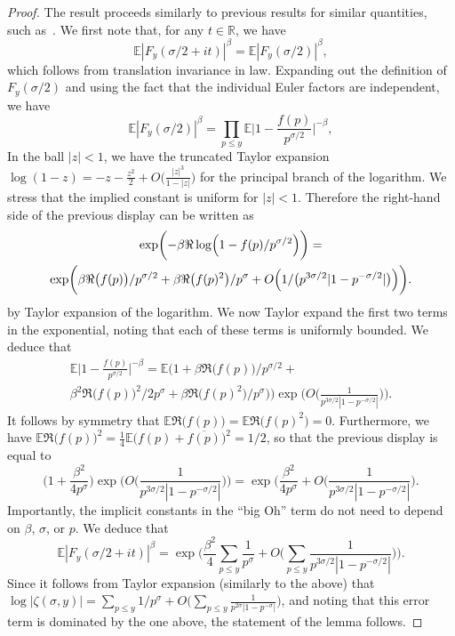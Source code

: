 \documentclass[12pt,a4paper,reqno]{amsart}
\numberwithin{equation}{section}
\def\R{\mathbb R}
\def\E{\mathbb E}
\def\leq {\leqslant}
\theoremstyle{remark}
\theoremstyle{definition}
\numberwithin{equation}{section}
\theoremstyle{remark}
\def\E{\mathbb E}
\begin{document}
\begin{proof}
The result proceeds similarly to previous results for similar quantities, such as~\cite[Euler Product Result 1]{Harperlargevalue}. We first note that, for any $t \in \R$, we have
\[
\E |F_y (\sigma / 2 + it) |^{\beta} = \E |F_y (\sigma / 2) |^{\beta},
\]
which follows from translation invariance in law. Expanding out the definition of $F_y (\sigma / 2)$ and using the fact that the individual Euler factors are independent, we have
\[
\E |F_y (\sigma / 2) |^{\beta} = \prod_{p \leq y} \E \biggl| 1 - \frac{f(p)}{p^{\sigma/2}} \biggr|^{-\beta} ,
\]
In the ball $|z| < 1$, we have the truncated Taylor expansion $\log (1 - z) = - z - \frac{z^2}{2} + O \bigl( \frac{|z|^3}{1 - |z|} \bigr)$ for the principal branch of the logarithm. We stress that the implied constant is uniform for $|z| < 1$. Therefore the right-hand side of the previous display can be written as
\begin{multline*}
\exp \biggl( - \beta \Re \log \Bigl( 1 - f(p) / p^{\sigma /2} \Bigr) \biggr) = \\ 
\exp \biggl( \beta \Re \bigl( f(p) \bigr) / p^{\sigma / 2} + \beta \Re \bigl( f(p)^2 \bigr) / p^{\sigma} + O \Bigl( 1 /\bigl( p^{3 \sigma / 2} |1 - p^{- \sigma/2}| \bigr) \Bigr) \biggr).
\end{multline*}
by Taylor expansion of the logarithm. We now Taylor expand the first two terms in the exponential, noting that each of these terms is uniformly bounded. We deduce that
\begin{multline*}
\E \biggl| 1 - \frac{f(p)}{p^{\sigma/2}} \biggr|^{-\beta} = 
\E \biggl( 1 + \beta \Re \bigl( f(p) \bigr) / p^{\sigma / 2} + \\ \beta^2 \Re \bigl( f(p) \bigr)^2 / 2 p^{\sigma} + \beta \Re \bigl( f(p)^2 \bigr) / p^{\sigma} \bigr) \biggr) \exp \biggl( O \biggl( \frac{1}{p^{3 \sigma / 2} |1 - p^{- \sigma / 2} |} \biggr) \biggr) .
\end{multline*}
It follows by symmetry that $\E \Re \bigl( f(p) \bigr) = \E \Re \bigl( f(p)^2 \bigr) = 0$. Furthermore, we have $\E \Re \bigl( f(p) \bigr)^2 = \frac{1}{4} \E \bigl( f (p) + \overline{f(p)} \bigr)^2 = 1/2 $, so that the previous display is equal to 
\[
\biggl( 1 + \frac{\beta^2}{4 p^{\sigma}} \biggr) \exp \biggl( O \biggl( \frac{1}{p^{3 \sigma / 2} | 1 - p^{-\sigma/2}|} \biggr) \biggr) = \exp \biggl( \frac{\beta^2}{4p^{\sigma}} + O \biggl( \frac{1}{p^{3 \sigma / 2} | 1 - p^{-\sigma/2}|} \biggr).
\]
Importantly, the implicit constants in the ``big Oh'' term do not need to depend on $\beta$, $\sigma$, or $p$. We deduce that
\[
\E |F_y (\sigma / 2 + it) |^{\beta} = \exp \biggl( \frac{\beta^2}{4} \sum_{p \leq y} \frac{1}{p^{\sigma}} + O \biggl( \sum_{p \leq y} \frac{1}{p^{3 \sigma / 2} | 1 - p^{-\sigma/2}|} \biggr) \biggr) .
\]
Since it follows from Taylor expansion (similarly to the above) that $\log |\zeta (\sigma, y)| = \sum_{p \leq y} 1/p^{\sigma} + O \bigl( \sum_{p \leq y}\frac{1}{p^{2 \sigma} |1 - p^{-\sigma}|} \bigr)$, and noting that this error term is dominated by the one above, the statement of the lemma follows. 
\end{proof}
\end{document}
